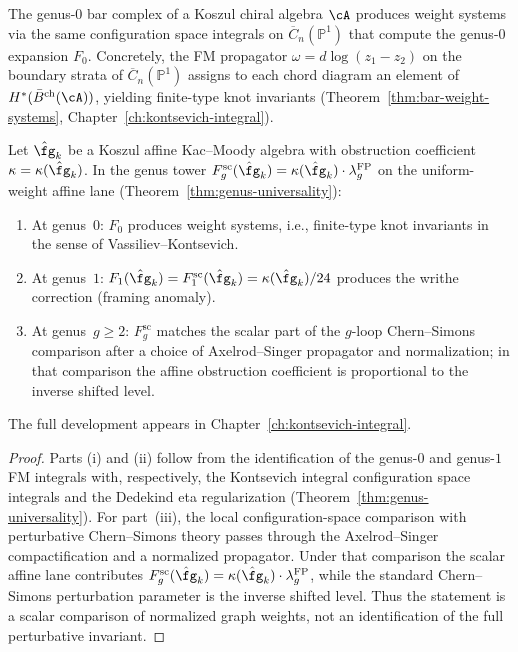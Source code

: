 \begin{remark}
\label{rem:genus-0-weight-systems}
The genus-$0$ bar complex of a Koszul chiral algebra $\cA$
produces weight systems via the same configuration space integrals
on $\overline{C}_n(\mathbb{P}^1)$ that compute the genus-$0$
expansion $F_0$. Concretely, the FM propagator
$\omega = d\log(z_1 - z_2)$ on the boundary strata of
$\overline{C}_n(\mathbb{P}^1)$ assigns to each chord diagram
an element of $H^*(\bar{B}^{\mathrm{ch}}(\cA))$, yielding
finite-type knot invariants
(Theorem~\ref{thm:bar-weight-systems},
Chapter~\ref{ch:kontsevich-integral}).
\end{remark}

\begin{proposition}
\label{prop:loop-expansion-knots}
Let $\hat{\fg}_k$ be a Koszul affine Kac--Moody algebra with
obstruction coefficient $\kappa = \kappa(\hat{\fg}_k)$. In the
genus tower
$F_g^{\mathrm{sc}}(\hat{\fg}_k)
= \kappa(\hat{\fg}_k) \cdot \lambda_g^{\mathrm{FP}}$
on the uniform-weight affine lane
\textup{(}Theorem~\textup{\ref{thm:genus-universality}}\textup{)}:
\begin{enumerate}
\item At genus~$0$: $F_0$ produces weight systems, i.e.,
 finite-type knot invariants in the sense of Vassiliev--Kontsevich.
\item At genus~$1$:
 $F_1(\hat{\fg}_k)=F_1^{\mathrm{sc}}(\hat{\fg}_k)
 =\kappa(\hat{\fg}_k)/24$ produces the writhe correction
 \textup{(}framing anomaly\textup{)}.
\item At genus~$g \geq 2$: $F_g^{\mathrm{sc}}$ matches the scalar part of the
 $g$-loop Chern--Simons comparison after a choice of
 Axelrod--Singer propagator and normalization; in that comparison the
 affine obstruction coefficient is proportional to the inverse shifted
 level.
\end{enumerate}
The full development appears in Chapter~\textup{\ref{ch:kontsevich-integral}}.
\end{proposition}

\begin{proof}
Parts (i) and (ii) follow from the identification of the genus-$0$
and genus-$1$ FM integrals with, respectively, the Kontsevich integral
configuration space integrals and the Dedekind eta regularization
(Theorem~\ref{thm:genus-universality}). For part~(iii), the local
configuration-space comparison with perturbative Chern--Simons theory
passes through the Axelrod--Singer compactification and a normalized
propagator. Under that comparison the scalar affine lane contributes
$F_g^{\mathrm{sc}}(\hat{\fg}_k)
=\kappa(\hat{\fg}_k) \cdot \lambda_g^{\mathrm{FP}}$, while the standard
Chern--Simons perturbation parameter is the inverse shifted level.
Thus the statement is a scalar comparison of normalized graph
weights, not an identification of the full perturbative invariant.
\end{proof}

